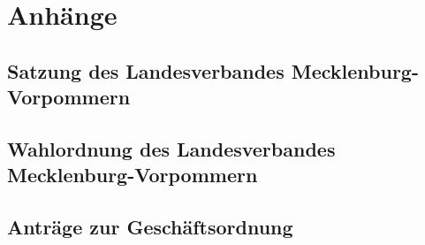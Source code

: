 \documentclass[a4paper,10pt]{scrreprt}
\begin{document}
\part{Anhänge}

\appendix

\chapter{Satzung des Landesverbandes Mecklenburg-Vorpommern}


\chapter{Wahlordnung des Landesverbandes Mecklenburg-Vorpommern}


\chapter{Anträge zur Geschäftsordnung}


\newpage
\null
\thispagestyle{empty}
\end{document}

